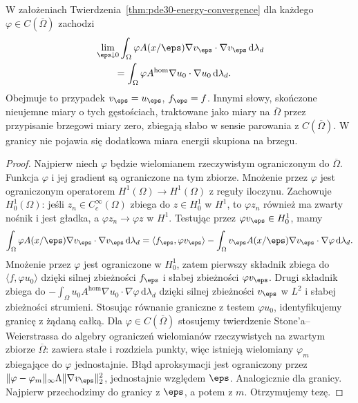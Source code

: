 \begin{wniosek}
\label{cor:pde30-local-energy}
W założeniach Twierdzenia~\ref{thm:pde30-energy-convergence}
dla każdego $\varphi\in C(\overline\Omega)$ zachodzi
\[
 \begin{aligned}
 &\lim_{\eps\downarrow0}\int_\Omega
 \varphi A(x/\eps)\nabla v_\eps\cdot\nabla v_\eps
 \,\mathrm d\lambda_d\\
 &\qquad=\int_\Omega
 \varphi A^{\mathrm{hom}}\nabla u_0\cdot\nabla u_0
 \,\mathrm d\lambda_d .
 \end{aligned}
\]
Obejmuje to przypadek $v_\eps=u_\eps$, $f_\eps=f$.
Innymi słowy, skończone nieujemne miary o tych
gęstościach, traktowane jako miary na $\overline\Omega$
przez przypisanie brzegowi miary zero, zbiegają
słabo w sensie parowania z $C(\overline\Omega)$.
W granicy nie pojawia się dodatkowa miara energii
skupiona na brzegu.
\end{wniosek}
\begin{proof}
Najpierw niech $\varphi$ będzie wielomianem
rzeczywistym ograniczonym do $\overline\Omega$.
Funkcja $\varphi$ i jej gradient są ograniczone
na tym zbiorze. Mnożenie przez $\varphi$ jest
ograniczonym operatorem $H^1(\Omega)\to H^1(\Omega)$
z reguły iloczynu. Zachowuje $H_0^1(\Omega)$:
jeśli $z_n\in C_c^\infty(\Omega)$ zbiega
do $z\in H_0^1$ w $H^1$, to $\varphi z_n$
również ma zwarty nośnik i jest gładka,
a $\varphi z_n\to\varphi z$ w $H^1$.
Testując przez $\varphi v_\eps\in H_0^1$, mamy
\[
 \int_\Omega\varphi A(x/\eps)\nabla v_\eps\cdot\nabla v_\eps
 \,\mathrm d\lambda_d
 =\langle f_\eps,\varphi v_\eps\rangle
 -\int_\Omega v_\eps A(x/\eps)\nabla v_\eps\cdot\nabla\varphi
 \,\mathrm d\lambda_d .
\]
Mnożenie przez $\varphi$ jest ograniczone w $H_0^1$,
zatem pierwszy składnik zbiega do
$\langle f,\varphi u_0\rangle$ dzięki silnej zbieżności
$f_\eps$ i słabej zbieżności $\varphi v_\eps$.
Drugi składnik zbiega do
$-\int_\Omega u_0 A^{\mathrm{hom}}\nabla u_0\cdot\nabla\varphi
\,\mathrm d\lambda_d$ dzięki silnej zbieżności $v_\eps$
w $L^2$ i słabej zbieżności strumieni.
Stosując równanie graniczne z testem $\varphi u_0$,
identyfikujemy granicę z żądaną całką.
Dla $\varphi\in C(\overline\Omega)$ stosujemy
twierdzenie Stone'a--Weierstrassa do algebry
ograniczeń wielomianów rzeczywistych na zwartym
zbiorze $\overline\Omega$: zawiera stałe i rozdziela
punkty, więc istnieją wielomiany $\varphi_m$
zbiegające do $\varphi$ jednostajnie.
Błąd aproksymacji jest ograniczony przez
$\|\varphi-\varphi_m\|_\infty
\Lambda\|\nabla v_\eps\|_2^2$,
jednostajnie względem $\eps$. Analogicznie dla
granicy. Najpierw przechodzimy do granicy z $\eps$,
a potem z $m$. Otrzymujemy tezę.
\end{proof}

